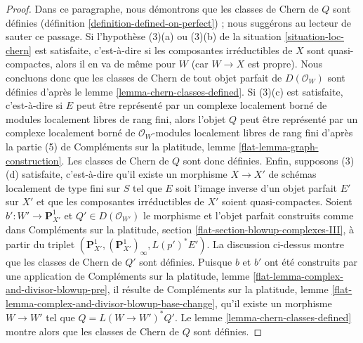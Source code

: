 \begin{proof}
\medskip\noindent
Dans ce paragraphe, nous démontrons que les classes de Chern de $Q$ sont définies
(définition \ref{definition-defined-on-perfect}) ; nous suggérons au lecteur de sauter
ce passage. Si l'hypothèse (3)(a) ou (3)(b) de la situation \ref{situation-loc-chern}
est satisfaite, c'est-à-dire si les composantes irréductibles de $X$ sont quasi-compactes, alors il en
va de même pour $W$ (car $W \to X$ est propre). Nous concluons donc que
les classes de Chern de tout objet parfait de $D(\mathcal{O}_W)$ sont définies d'après le
lemme \ref{lemma-chern-classes-defined}. Si (3)(c) est satisfaite, c'est-à-dire si
$E$ peut être représenté par un complexe localement borné de modules localement
libres de rang fini, alors l'objet $Q$ peut être représenté par un complexe localement borné
de $\mathcal{O}_W$-modules localement libres de rang fini d'après la partie (5) de
Compléments sur la platitude, lemme \ref{flat-lemma-graph-construction}. Les
classes de Chern de $Q$ sont donc définies. Enfin, supposons (3)(d) satisfaite, c'est-à-dire
qu'il existe un morphisme $X \to X'$ de schémas localement de type fini
sur $S$ tel que $E$ soit l'image inverse d'un objet parfait $E'$ sur $X'$ et que
les composantes irréductibles de $X'$ soient quasi-compactes.
Soient $b' : W' \to \mathbf{P}^1_{X'}$ et $Q' \in D(\mathcal{O}_{W'})$
le morphisme et l'objet parfait construits comme
dans Compléments sur la platitude, section \ref{flat-section-blowup-complexes-III},
à partir du triplet
$(\mathbf{P}^1_{X'}, (\mathbf{P}^1_{X'})_\infty, L(p')^*E')$.
La discussion ci-dessus montre que les classes de Chern de $Q'$
sont définies. Puisque $b$ et $b'$ ont été construits par une application de
Compléments sur la platitude, lemme \ref{flat-lemma-complex-and-divisor-blowup-pre},
il résulte de
Compléments sur la platitude, lemme \ref{flat-lemma-complex-and-divisor-blowup-base-change},
qu'il existe un morphisme $W \to W'$ tel que
$Q = L(W \to W')^*Q'$. Le
lemme \ref{lemma-chern-classes-defined}
montre alors que les classes de Chern de $Q$ sont définies.
\end{proof}

